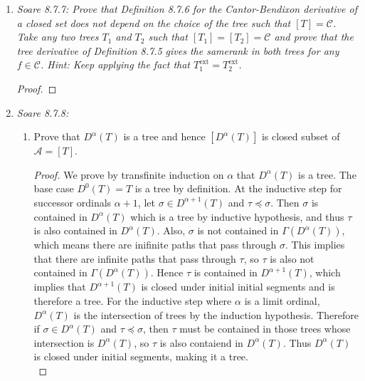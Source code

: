 \documentclass{article}
\begin{document}
\begin{enumerate}[label={\bf Q\arabic*:}]
  \item \it Soare 8.7.7: Prove that Definition 8.7.6 for the
    Cantor-Bendixon derivative of a closed set does not depend on the
    choice of the tree such that $[T]=\mathcal{C}$. Take any two trees
    $T_1$ and $T_2$ such that $[T_1]=[T_2]=\mathcal{C}$ and prove that the
    tree derivative of Definition 8.7.5 gives the samerank in both trees
    for any $f\in\mathcal{C}$. Hint: Keep applying the fact that
    $T_1^{\text{ext}}=T_2^{\text{ext}}$.

    \begin{proof}
    \end{proof}

  \item \it Soare 8.7.8:
    \begin{enumerate}[label={(\roman*)}]
      \item Prove that $D^\alpha(T)$ is a tree and hence $[D^\alpha(T)]$ is
        closed subset of $\mathcal{A}=[T]$.

        \begin{proof}
          We prove by transfinite induction on $\alpha$ that $D^\alpha(T)$
          is a tree. The base case $D^0(T)=T$ is a tree by definition.
          At the inductive step for successor ordinals $\alpha+1$, let
          $\sigma\in D^{\alpha+1}(T)$ and $\tau\preceq\sigma$. Then
          $\sigma$ is contained in $D^\alpha(T)$ which is a tree by
          inductive hypothesis, and thus $\tau$ is also contained in
          $D^\alpha(T)$. Also, $\sigma$ is not contained in
          $\Gamma(D^\alpha(T))$, which means there are inifinite paths that
          pass through $\sigma$. This implies that there are infinite paths
          that pass through $\tau$, so $\tau$ is also not contained in
          $\Gamma(D^\alpha(T))$. Hence $\tau$ is contained in
          $D^{\alpha+1}(T)$, which implies that $D^{\alpha+1}(T)$ is closed
          under initial initial segments and is therefore a tree. For the
          inductive step where $\alpha$ is a limit ordinal, $D^\alpha(T)$
          is the intersection of trees by the induction hypothesis.
          Therefore if $\sigma\in D^\alpha(T)$ and $\tau\preceq\sigma$,
          then $\tau$ must be contained in those trees whose intersection
          is $D^\alpha(T)$, so $\tau$ is also contaiend in $D^\alpha(T)$.
          Thus $D^\alpha(T)$ is closed under initial segments, making it a 
          tree. \\
        \end{proof}


\end{enumerate}
\end{enumerate}
\end{document}
